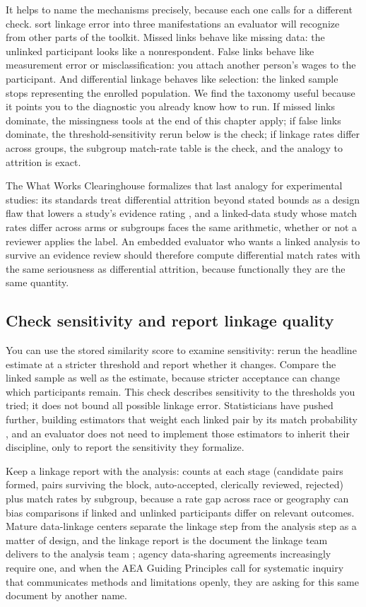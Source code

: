 It helps to name the mechanisms precisely, because each one calls for a different check. \textcite{doidge2019linkage} sort linkage error into three manifestations an evaluator will recognize from other parts of the toolkit. Missed links behave like missing data: the unlinked participant looks like a nonrespondent. False links behave like measurement error or misclassification: you attach another person's wages to the participant. And differential linkage behaves like selection: the linked sample stops representing the enrolled population. We find the taxonomy useful because it points you to the diagnostic you already know how to run. If missed links dominate, the missingness tools at the end of this chapter apply; if false links dominate, the threshold-sensitivity rerun below is the check; if linkage rates differ across groups, the subgroup match-rate table is the check, and the analogy to attrition is exact.

The What Works Clearinghouse formalizes that last analogy for experimental studies: its standards treat differential attrition beyond stated bounds as a design flaw that lowers a study's evidence rating \parencite{wwc2022handbook}, and a linked-data study whose match rates differ across arms or subgroups faces the same arithmetic, whether or not a reviewer applies the label. An embedded evaluator who wants a linked analysis to survive an evidence review should therefore compute differential match rates with the same seriousness as differential attrition, because functionally they are the same quantity.

\subsection{Check sensitivity and report linkage quality}\label{sec:ch06-defenses}
You can use the stored similarity score to examine sensitivity: rerun the headline estimate at a stricter threshold and report whether it changes. Compare the linked sample as well as the estimate, because stricter acceptance can change which participants remain. This check describes sensitivity to the thresholds you tried; it does not bound all possible linkage error. Statisticians have pushed further, building estimators that weight each linked pair by its match probability \parencite{lahiri2005linked}, and an evaluator does not need to implement those estimators to inherit their discipline, only to report the sensitivity they formalize.

Keep a linkage report with the analysis: counts at each stage (candidate pairs formed, pairs surviving the block, auto-accepted, clerically reviewed, rejected) plus match rates by subgroup, because a rate gap across race or geography can bias comparisons if linked and unlinked participants differ on relevant outcomes. Mature data-linkage centers separate the linkage step from the analysis step as a matter of design, and the linkage report is the document the linkage team delivers to the analysis team \parencite{harron2017challenges}; agency data-sharing agreements increasingly require one, and when the AEA Guiding Principles call for systematic inquiry that communicates methods and limitations openly, they are asking for this same document by another name.

